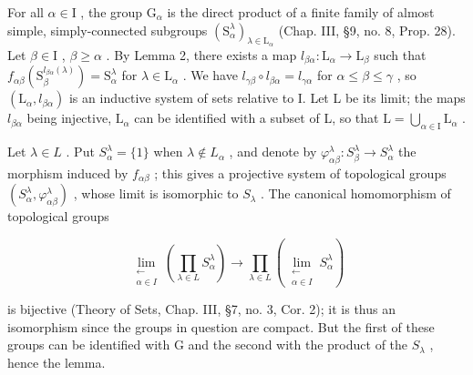 For all \(\alpha \in \mathrm{I}\) , the group \(\mathrm{G}_{\alpha}\) is the direct product of a finite family of almost simple, simply-connected subgroups \((\mathrm{S}_{\alpha}^{\lambda})_{\lambda \in \mathrm{L}_{\alpha}}\) (Chap. III, §9, no. 8, Prop. 28). Let \(\beta \in \mathrm{I}\) , \(\beta \geq \alpha\) . By Lemma 2, there exists a map \(l_{\beta \alpha}: \mathrm{L}_{\alpha} \to \mathrm{L}_{\beta}\) such that \(f_{\alpha \beta}(\mathrm{S}_{\beta}^{l_{\beta \alpha}(\lambda)}) = \mathrm{S}_{\alpha}^{\lambda}\) for \(\lambda \in \mathrm{L}_{\alpha}\) . We have \(l_{\gamma \beta} \circ l_{\beta \alpha} = l_{\gamma \alpha}\) for \(\alpha \leq \beta \leq \gamma\) , so \((\mathrm{L}_{\alpha}, l_{\beta \alpha})\) is an inductive system of sets relative to I. Let L be its limit; the maps \(l_{\beta \alpha}\) being injective, \(\mathrm{L}_{\alpha}\) can be identified with a subset of L, so that \(\mathrm{L} = \bigcup_{\alpha \in \mathrm{I}} \mathrm{L}_{\alpha}\) .

Let \(\lambda \in L\) . Put \(S_{\alpha}^{\lambda} = \{1\}\) when \(\lambda \notin L_{\alpha}\) , and denote by \(\varphi_{\alpha \beta}^{\lambda}: S_{\beta}^{\lambda} \to S_{\alpha}^{\lambda}\) the morphism induced by \(f_{\alpha \beta}\) ; this gives a projective system of topological groups \((S_{\alpha}^{\lambda}, \varphi_{\alpha \beta}^{\lambda})\) , whose limit is isomorphic to \(S_{\lambda}\) . The canonical homomorphism of topological groups

\[
\lim_{\substack{\longleftarrow \\ \alpha \in I}}\left(\prod_{\lambda \in L}S_{\alpha}^{\lambda}\right)\to \prod_{\lambda \in L}\left(\lim_{\substack{\longleftarrow \\ \alpha \in I}}S_{\alpha}^{\lambda}\right)
\]

is bijective (Theory of Sets, Chap. III, §7, no. 3, Cor. 2); it is thus an isomorphism since the groups in question are compact. But the first of these groups can be identified with G and the second with the product of the \(S_{\lambda}\) , hence the lemma.

